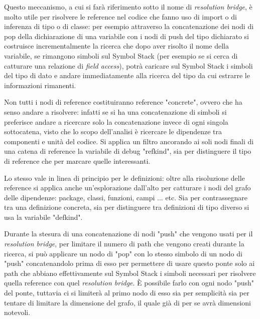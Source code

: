 \par
Questo meccanismo, a cui si far\`a riferimento sotto il nome di \emph{resolution bridge}, \`e molto utile per risolvere le reference nel codice che fanno uso di import o di inferenza di tipo o di classe: per esempio attraverso la concatenazione dei nodi di pop della dichiarazione di una variabile con i nodi di push del tipo dichiarato si costruisce incrementalmente la ricerca che dopo aver risolto il nome della variabile, se rimangono simboli sul Symbol Stack (per esempio se si cerca di catturare una relazione di \emph{field access}), potr\`a caricare sul Symbol Stack i simboli del tipo di dato e andare immediatamente alla ricerca del tipo da cui estrarre le informazioni rimanenti.

\par
Non tutti i nodi di reference costituiranno reference "concrete", ovvero che ha senso andare a risolvere: infatti se si ha una concatenazione di simboli si preferisce andare a ricercare solo la concatenazione invece di ogni singola sottocatena, visto che lo scopo dell'analisi \`e ricercare le dipendenze tra componenti e unit\`a del codice. Si applica un filtro ancorando ai soli nodi finali di una catena di reference la variabile di debug "refkind", sia per distinguere il tipo di reference che per marcare quelle interessanti.

\par
Lo stesso vale in linea di principio per le definizioni: oltre alla risoluzione delle reference si applica anche un'esplorazione dall'alto per catturare i nodi del grafo delle dipendenze: package, classi, funzioni, campi ... etc. Sia per contrassegnare tra una definizione concreta, sia per distinguere tra definizioni di tipo diverso si usa la variabile "defkind".

\par
Durante la stesura di una concatenazione di nodi "push" che vengono usati per il \emph{resolution bridge}, per limitare il numero di path che vengono creati durante la ricerca, si pu\`o applicare un nodo di "pop" con lo stesso simbolo di un nodo di "push" concatenandolo prima di esso per permettere di usare questo ponte solo ai path che abbiano effettivamente sul Symbol Stack i simboli necessari per risolvere quella reference con quel \emph{resolution bridge}.
\`E possibile farlo con ogni nodo "push" del ponte, tuttavia ci si limiter\`a al primo nodo di esso sia per semplicit\`a sia per tentare di limitare la dimensione del grafo, il quale gi\`a di per se avr\`a dimensioni notevoli.

